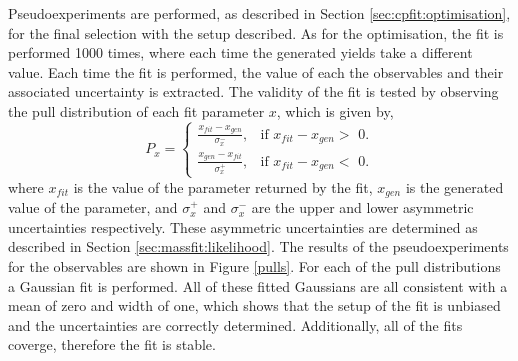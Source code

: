 Pseudoexperiments are performed, as described in Section \ref{sec:cpfit:optimisation}, for the final selection with the setup described. As for the optimisation, the \CP fit is performed 1000 times, where each time the generated yields take a different value. Each time the fit is performed, the value of each the \CP observables and their associated uncertainty is extracted. The validity of the fit is tested by observing the pull distribution of each fit parameter $x$, which is given by,
\begin{equation*}
P_x = \begin{cases}
	\frac{x_{fit} - x_{gen}}{\sigma_x^-}, & \text{if $x_{fit} - x_{gen} >$ 0}. \\
	\frac{x_{gen} - x_{fit}}{\sigma_x^+}, & \text{if $x_{fit} - x_{gen} <$ 0}.
	\end{cases}
\end{equation*}
where $x_{fit}$ is the value of the parameter returned by the fit, $x_{gen}$ is the generated value of the parameter, and $\sigma_x^+$ and $\sigma_x^-$ are the upper and lower asymmetric uncertainties respectively. These asymmetric uncertainties are determined as described in Section \ref{sec:massfit:likelihood}. The results of the pseudoexperiments for the \CP observables are shown in Figure \ref{pulls}. For each of the pull distributions a Gaussian fit is performed. All of these fitted Gaussians are all consistent with a mean of zero and width of one, which shows that the setup of the \CP fit is unbiased and the uncertainties are correctly determined. Additionally, all of the fits coverge, therefore the fit is stable. 
 
%


